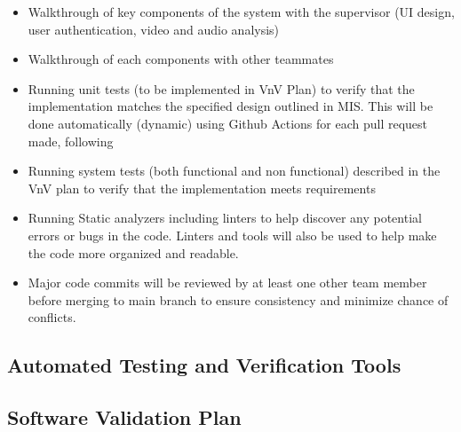 \documentclass[12pt, titlepage]{article}
\begin{document}
\begin{itemize}
  \item Walkthrough of key components of the system with the supervisor (UI design, user authentication, video and audio analysis)
  \item Walkthrough of each components with other teammates 
  \item Running unit tests (to be implemented in VnV Plan) to verify that the implementation matches the specified design outlined in MIS. This will be done automatically (dynamic) using Github Actions for each pull request made, following
  \item Running system tests (both functional and non functional) described in the VnV plan to verify that the implementation meets requirements
  \item Running Static analyzers including linters to help discover any potential errors or bugs in the code. Linters and tools will also be used to help make the code more organized and readable. 
  \item Major code commits will be reviewed by at least one other team member before merging to main branch to ensure consistency and minimize chance of conflicts. 
\end{itemize}
\subsection{Automated Testing and Verification Tools}




\subsection{Software Validation Plan}
\end{document}
